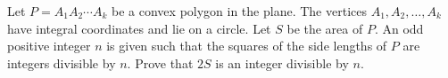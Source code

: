 Let 
$P=A_1A_2\cdots A_k$
 be a convex polygon in the plane. The vertices 
$A_1, A_2, \ldots, A_k$
 have integral coordinates and lie on a circle. Let 
$S$
 be the area of 
$P$. 
 An odd positive integer 
$n$
 is given such that the squares of the side lengths of 
$P$
 are integers divisible by 
$n$. 
 Prove that 
$2S$
 is an integer divisible by 
$n$. 
